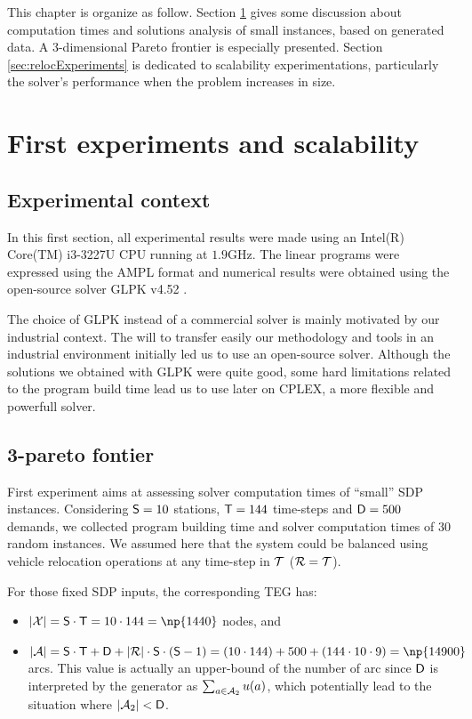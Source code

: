 \bigskip
This chapter is organize as follow.
Section \ref{sec:firstExperiments} gives some discussion about computation times and solutions analysis of small instances, based on generated data.
A 3-dimensional Pareto frontier is especially presented.
Section \ref{sec:relocExperiments} is dedicated to scalability experimentations, particularly the solver's performance when the problem increases in size.

\section{First experiments and scalability} \label{sec:firstExperiments}
\subsection{Experimental context}
In this first section, all experimental results were made using an Intel(R) Core(TM) i3-3227U CPU running at $1.9$GHz. The linear programs were expressed using the AMPL format \cite{ampl_webPage} and numerical results were obtained using the open-source solver GLPK v4.52 \cite{glpk_webPage}.

\bigskip
The choice of GLPK instead of a commercial solver is mainly motivated by our industrial context.
The will to transfer easily our methodology and tools in an industrial environment initially led us to use an open-source solver.
Although the solutions we obtained with GLPK were quite good, some hard limitations related to the program build time lead us to use later on CPLEX, a more flexible and powerfull solver.

\subsection{3-pareto fontier}
First experiment aims at assessing solver computation times of ``small'' SDP instances.
Considering $\mathsf{S} = 10$ stations, $\mathsf{T} = 144$ time-steps and $\mathsf{D} = 500$ demands, we collected program building time and solver computation times of $30$ random instances.
We assumed here that the system could be balanced using vehicle relocation operations at any time-step in $\mathcal{T}$ (\ie $\mathcal{R} = \mathcal{T}$).

\bigskip
For those fixed SDP inputs, the corresponding TEG has:
\begin{itemize}
\item $|\tegNodeSet| = \nbStations \cdot \nbTimeSteps = 10 \cdot 144 = \np{1440}$ nodes, and
\item $|\tegArcSet| = \nbStations \cdot \nbTimeSteps + \nbDemands + |\relocTimeStepSet| \cdot \nbStations \cdot (\nbStations - 1) = (10 \cdot 144) + 500 + (144 \cdot 10 \cdot 9) = \np{14900}$ arcs. This value is actually an upper-bound of the number of arc since $\mathsf{D}$ is interpreted by the generator as $\sum_{a \in \mathcal{A}_2} u(a)$, which potentially lead to the situation where $|\mathcal{A}_2| < \mathsf{D}$.
\end{itemize}

